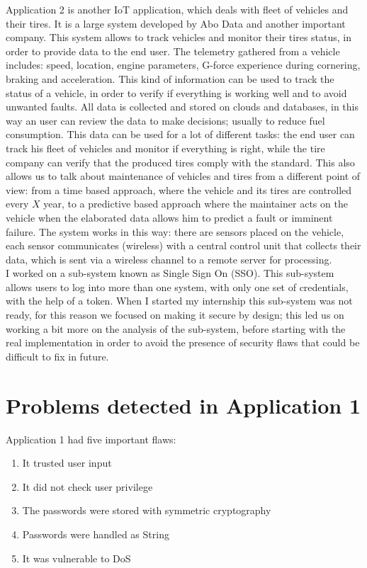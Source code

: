 Application 2 is another IoT application, which deals with fleet of vehicles and their tires. It is a large system developed by Abo Data and another important company.
This system allows to track vehicles and monitor their tires status, in order to provide data to the end user.\newline
The telemetry gathered from a vehicle includes: speed, location, engine parameters, G-force experience during cornering, braking and acceleration.\newline
This kind of information can be used to track the status of a vehicle, in order to verify if everything is working well and to avoid unwanted faults.\newline
All data is collected and stored on clouds and databases, in this way an user can review the data to make decisions; usually to reduce fuel consumption.\newline
This data can be used for a lot of different tasks: the end user can track his fleet of vehicles and monitor if everything is right, while the tire company can verify that the produced tires comply with the standard.\newline
This also allows us to talk about maintenance of vehicles and tires from a different point of view: from a time based
approach, where the vehicle and its tires are controlled every $X$ year, to a predictive based approach where the maintainer acts on the vehicle when the elaborated data allows him to predict a fault or imminent failure.\newline
The system works in this way: there are sensors placed on the vehicle, each sensor communicates (wireless) with a central control unit that collects their data, which is sent via a wireless channel to a remote server for processing.\\

I worked on a sub-system known as Single Sign On (SSO). This sub-system allows users to log into more than one system,
with only one set of credentials, with the help of a token.\newline
When I started my internship this sub-system was not ready, for this reason we focused on making it secure by design; this led us on working a bit more on the analysis of the sub-system, before starting with the real implementation in order to avoid the presence of security flaws that could be difficult to fix in future.\newline


\section{Problems detected in Application 1}
Application 1 had five important flaws:
\begin{enumerate}
	\item It trusted user input
	\item It did not check user privilege
	\item The passwords were stored with symmetric cryptography
	\item Passwords were handled as String
	\item It was vulnerable to DoS
\end{enumerate}


